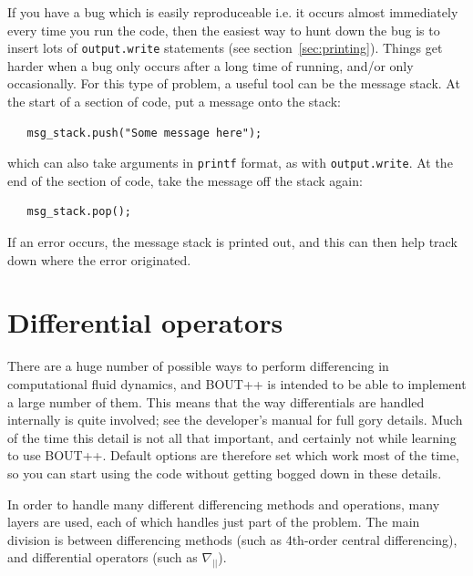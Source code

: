 \documentclass[12pt]{article}
\newcommand{\code}[1]{\texttt{#1}}
\begin{document}
If you have a bug which is easily reproduceable i.e. it occurs almost immediately every time
you run the code, then the easiest way to hunt down the bug is to insert lots of \code{output.write}
statements (see section~\ref{sec:printing}). Things get harder when a bug only occurs after a long time
of running, and/or only occasionally. For this type of problem, a useful tool
can be the message stack.
At the start of a section of code, put a message onto the stack: 
\begin{lstlisting}
   msg_stack.push("Some message here");
\end{lstlisting}
which can also take arguments in \code{printf} format, as with \code{output.write}. At the end of the section of code, take the message off the stack again:
\begin{lstlisting}
   msg_stack.pop();
\end{lstlisting}
If an error occurs, the message stack is printed out, and this can then
help track down where the error originated.


\section{Differential operators}
\label{sec:diffops}

There are a huge number of possible ways to perform differencing in computational
fluid dynamics, and BOUT++ is intended to be able to implement a large number of them. This
means that the way differentials are handled internally is quite involved; see the
developer's manual for full gory details. Much of the time this detail is not all that
important, and certainly not while learning to use BOUT++. Default options are
therefore set which work most of the time, so you can start using the code without
getting bogged down in these details.

In order to handle many different differencing methods and operations, many layers are
used, each of which handles just part of the problem. The main division is between
differencing methods (such as 4th-order central differencing), and differential operators
(such as $\nabla_{||}$).
\end{document}
